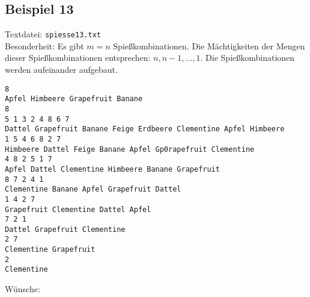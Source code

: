 \subsection{Beispiel 13}\label{example:13}
Textdatei: \texttt{spiesse13.txt}\\
Besonderheit: Es gibt $m = n$ Spießkombinationen. Die Mächtigkeiten der Mengen dieser Spießkombinationen entsprechen:
$n, n-1, ..., 1$. Die Spießkombinationen werden aufeinander aufgebaut.
\begin{verbatim}
8
Apfel Himbeere Grapefruit Banane
8
5 1 3 2 4 8 6 7 
Dattel Grapefruit Banane Feige Erdbeere Clementine Apfel Himbeere
1 5 4 6 8 2 7
Himbeere Dattel Feige Banane Apfel Gp0rapefruit Clementine
4 8 2 5 1 7 
Apfel Dattel Clementine Himbeere Banane Grapefruit
8 7 2 4 1
Clementine Banane Apfel Grapefruit Dattel
1 4 2 7
Grapefruit Clementine Dattel Apfel
7 2 1
Dattel Grapefruit Clementine
2 7
Clementine Grapefruit
2
Clementine
\end{verbatim}

\noindent
Wünsche: 
\vspace{0.25cm}

\noindent
{}